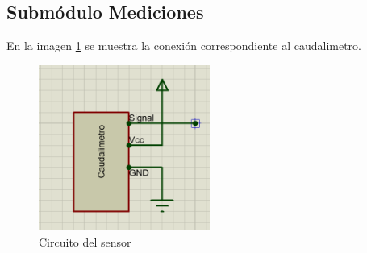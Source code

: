 \subsection{Submódulo Mediciones}
En la imagen \ref{fig:CircuitoCau} se muestra la conexión correspondiente al caudalimetro.

\begin{figure}[H]
	\centering
	\includegraphics[width=0.5\textwidth]{Capitulo4/hardware/images/CircuitoCaudalimetro}
	\caption{Circuito del sensor}
	\label{fig:CircuitoCau}
\end{figure}